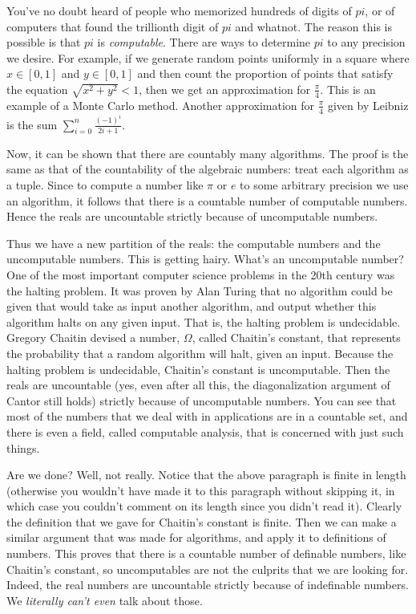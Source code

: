 \documentclass[letterpaper]{article}
\numberwithin{equation}{section}
\begin{document}
You've no doubt heard of people who memorized hundreds of digits of $pi$, or of computers that found the trillionth digit of $pi$ and whatnot. The reason this is possible is that $pi$ is \textit{computable}. There are ways to determine $pi$ to any precision we desire. For example, if we generate random points uniformly in a square where $x\in[0,1]$ and $y\in[0,1]$ and then count the proportion of points that satisfy the equation $\sqrt{x^2+y^2}<1$, then we get an approximation for $\frac{\pi}{4}$. This is an example of a Monte Carlo method. Another approximation for $\frac{\pi}{4}$ given by Leibniz is the sum $\sum_{i=0}^n\frac{(-1)^{i}}{2i+1}$.

Now, it can be shown that there are countably many algorithms. The proof is the same as that of the countability of the algebraic numbers: treat each algorithm as a tuple. Since to compute a number like $\pi$ or $e$ to some arbitrary precision we use an algorithm, it follows that there is a countable number of computable numbers. Hence the reals are uncountable strictly because of uncomputable numbers.

Thus we have a new partition of the reals: the computable numbers and the uncomputable numbers. This is getting hairy. What's an uncomputable number? One of the most important computer science problems in the 20th century was the halting problem. It was proven by Alan Turing that no algorithm could be given that would take as input another algorithm, and output whether this algorithm halts on any given input. That is, the halting problem is undecidable. Gregory Chaitin devised a number, $\Omega$, called Chaitin's constant, that represents the probability that a random algorithm will halt, given an input. Because the halting problem is undecidable, Chaitin's constant is uncomputable. Then the reals are uncountable (yes, even after all this, the diagonalization argument of Cantor still holds) strictly because of uncomputable numbers. You can see that most of the numbers that we deal with in applications are in a countable set, and there is even a field, called computable analysis, that is concerned with just such things.

Are we done? Well, not really. Notice that the above paragraph is finite in length (otherwise you wouldn't have made it to this paragraph without skipping it, in which case you couldn't comment on its length since you didn't read it). Clearly the definition that we gave for Chaitin's constant is finite. Then we can make a similar argument that was made for algorithms, and apply it to definitions of numbers. This proves that there is a countable number of definable numbers, like Chaitin's constant, so uncomputables are not the culprits that we are looking for. Indeed, the real numbers are uncountable strictly because of indefinable numbers. We \textit{literally can't even} talk about those.
\end{document}

